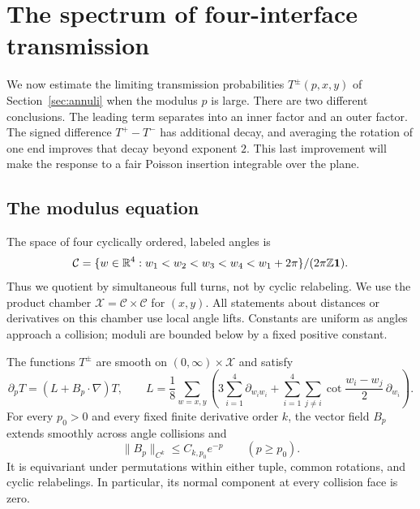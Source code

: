 \section{The spectrum of four-interface transmission}
\label{sp:section}
\label{sec:spectrum}

We now estimate the limiting transmission probabilities
$T^\pm(p,x,y)$ of Section~\ref{sec:annuli} when the modulus $p$ is large.
There are two different conclusions.  The leading term separates into an
inner factor and an outer factor.  The signed difference $T^+-T^-$ has
additional decay, and averaging the rotation of one end improves that
decay beyond exponent $2$.  This last improvement will make the response
to a fair Poisson insertion integrable over the plane.

\subsection{The modulus equation}

The space of four cyclically ordered, labeled angles is
\[
 \mathcal C=
 \{w\in\mathbb R^4:w_1<w_2<w_3<w_4<w_1+2\pi\}
       /(2\pi\mathbb Z\mathbf 1).
\]
Thus we quotient by simultaneous full turns, not by cyclic relabeling.
We use the product chamber $\mathcal X=\mathcal C\times\mathcal C$ for
$(x,y)$.  All statements about distances or derivatives on this chamber
use local angle lifts.  Constants are uniform as angles approach a
collision; moduli are bounded below by a fixed positive constant.

\begin{proposition}\label{sp:annular-pde}
The functions $T^\pm$ are smooth on $(0,\infty)\times\mathcal X$ and
satisfy
\begin{equation}\label{sp:pde}
 \partial_pT=(L+B_p\cdot\nabla)T,
 \qquad
 L=\frac18\sum_{w=x,y}
 \left(3\sum_{i=1}^4\partial_{w_iw_i}
 +\sum_{i=1}^4\sum_{j\ne i}
       \cot\frac{w_i-w_j}{2}\,\partial_{w_i}\right).
\end{equation}
For every $p_0>0$ and every fixed finite derivative order $k$,
the vector field $B_p$ extends smoothly across angle collisions and
\[
 \|B_p\|_{C^k}\le C_{k,p_0}e^{-p}\qquad(p\ge p_0).
\]
It is equivariant under permutations within either tuple, common
rotations, and cyclic relabelings.  In particular, its normal component
at every collision face is zero.
\end{proposition}

